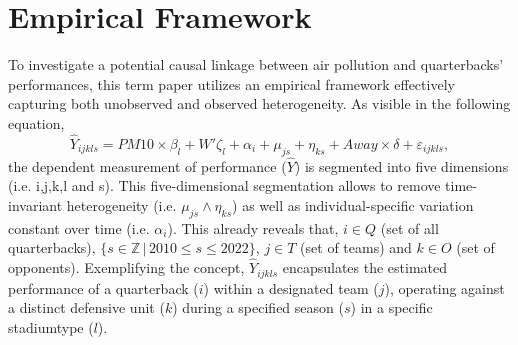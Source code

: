 \documentclass[12pt,a4paper]{article}
\begin{document}
\section{Empirical Framework}
\label{4}
To investigate a potential causal linkage between air pollution and quarterbacks' performances, this term paper utilizes an empirical framework effectively capturing both unobserved and observed heterogeneity. As visible in the following equation,
\begin{equation}
\hat{Y}_{ijkls} = PM10 \times \beta_l + {W'} \zeta_l + \alpha_i + \mu_{js} + \eta_{ks} + Away \times \delta + \varepsilon_{ijkls},
\end{equation}
the dependent measurement of performance ($\hat{Y}$) is segmented into five dimensions (i.e. i,j,k,l and s). This five-dimensional segmentation allows to remove time-invariant heterogeneity (i.e. $ \mu_{js} \wedge \eta_{ks}$) as well as individual-specific variation constant over time (i.e. $\alpha_i$). This already reveals that, $i \in Q$ (set of all quarterbacks), $\{s \in \mathbb{Z} \, | \, 2010 \leq s \leq 2022\}$, $j \in T$ (set of teams) and $k \in O$ (set of opponents). Exemplifying the concept, $\hat{Y}_{ijkls}$ encapsulates the estimated performance of a quarterback ($i$) within a designated team ($j$), operating against a distinct defensive unit ($k$) during a specified season ($s$) in a specific stadiumtype ($l$). 
\end{document}
